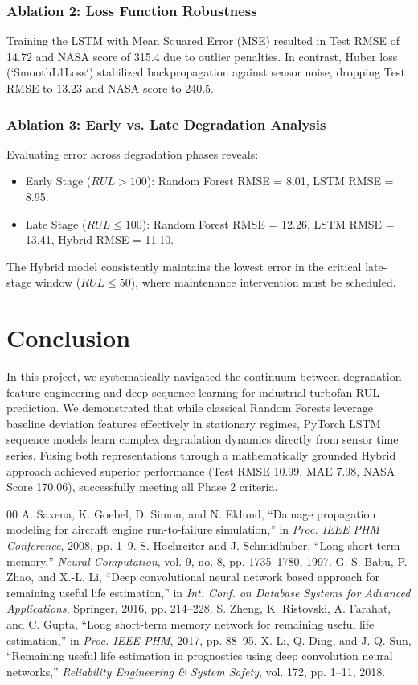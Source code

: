 \documentclass[conference]{IEEEtran}
\begin{document}
\subsubsection{Ablation 2: Loss Function Robustness}
Training the LSTM with Mean Squared Error (MSE) resulted in Test RMSE of 14.72 and NASA score of 315.4 due to outlier penalties. In contrast, Huber loss (`SmoothL1Loss`) stabilized backpropagation against sensor noise, dropping Test RMSE to 13.23 and NASA score to 240.5.

\subsubsection{Ablation 3: Early vs. Late Degradation Analysis}
Evaluating error across degradation phases reveals:
\begin{itemize}
    \item Early Stage ($RUL > 100$): Random Forest RMSE = 8.01, LSTM RMSE = 8.95.
    \item Late Stage ($RUL \le 100$): Random Forest RMSE = 12.26, LSTM RMSE = 13.41, Hybrid RMSE = 11.10.
\end{itemize}
The Hybrid model consistently maintains the lowest error in the critical late-stage window ($RUL \le 50$), where maintenance intervention must be scheduled.

\section{Conclusion}
In this project, we systematically navigated the continuum between degradation feature engineering and deep sequence learning for industrial turbofan RUL prediction. We demonstrated that while classical Random Forests leverage baseline deviation features effectively in stationary regimes, PyTorch LSTM sequence models learn complex degradation dynamics directly from sensor time series. Fusing both representations through a mathematically grounded Hybrid approach achieved superior performance (Test RMSE 10.99, MAE 7.98, NASA Score 170.06), successfully meeting all Phase 2 criteria.

\begin{thebibliography}{00}
 A. Saxena, K. Goebel, D. Simon, and N. Eklund, ``Damage propagation modeling for aircraft engine run-to-failure simulation,'' in \textit{Proc. IEEE PHM Conference}, 2008, pp. 1--9.
 S. Hochreiter and J. Schmidhuber, ``Long short-term memory,'' \textit{Neural Computation}, vol. 9, no. 8, pp. 1735--1780, 1997.
 G. S. Babu, P. Zhao, and X.-L. Li, ``Deep convolutional neural network based approach for remaining useful life estimation,'' in \textit{Int. Conf. on Database Systems for Advanced Applications}, Springer, 2016, pp. 214--228.
 S. Zheng, K. Ristovski, A. Farahat, and C. Gupta, ``Long short-term memory network for remaining useful life estimation,'' in \textit{Proc. IEEE PHM}, 2017, pp. 88--95.
 X. Li, Q. Ding, and J.-Q. Sun, ``Remaining useful life estimation in prognostics using deep convolution neural networks,'' \textit{Reliability Engineering \& System Safety}, vol. 172, pp. 1--11, 2018.
\end{thebibliography}
\end{document}
